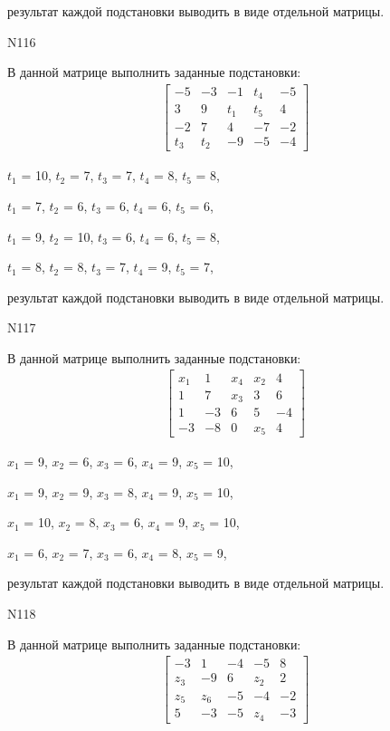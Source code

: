 \documentclass[11pt]{report}
\begin{document}
результат каждой подстановки выводить в виде отдельной матрицы.

N116

В данной матрице выполнить заданные подстановки:
\begin{align*}
\left[\begin{matrix}-5 & -3 & -1 & t_{4} & -5\\3 & 9 & t_{1} & t_{5} & 4\\-2 & 7 & 4 & -7 & -2\\t_{3} & t_{2} & -9 & -5 & -4\end{matrix}\right]
\end{align*}


$t_{1}$ = 10, $t_{2}$ = 7, $t_{3}$ = 7, $t_{4}$ = 8, $t_{5}$ = 8, 

$t_{1}$ = 7, $t_{2}$ = 6, $t_{3}$ = 6, $t_{4}$ = 6, $t_{5}$ = 6, 

$t_{1}$ = 9, $t_{2}$ = 10, $t_{3}$ = 6, $t_{4}$ = 6, $t_{5}$ = 8, 

$t_{1}$ = 8, $t_{2}$ = 8, $t_{3}$ = 7, $t_{4}$ = 9, $t_{5}$ = 7, 

результат каждой подстановки выводить в виде отдельной матрицы.

N117

В данной матрице выполнить заданные подстановки:
\begin{align*}
\left[\begin{matrix}x_{1} & 1 & x_{4} & x_{2} & 4\\1 & 7 & x_{3} & 3 & 6\\1 & -3 & 6 & 5 & -4\\-3 & -8 & 0 & x_{5} & 4\end{matrix}\right]
\end{align*}


$x_{1}$ = 9, $x_{2}$ = 6, $x_{3}$ = 6, $x_{4}$ = 9, $x_{5}$ = 10, 

$x_{1}$ = 9, $x_{2}$ = 9, $x_{3}$ = 8, $x_{4}$ = 9, $x_{5}$ = 10, 

$x_{1}$ = 10, $x_{2}$ = 8, $x_{3}$ = 6, $x_{4}$ = 9, $x_{5}$ = 10, 

$x_{1}$ = 6, $x_{2}$ = 7, $x_{3}$ = 6, $x_{4}$ = 8, $x_{5}$ = 9, 

результат каждой подстановки выводить в виде отдельной матрицы.

N118

В данной матрице выполнить заданные подстановки:
\begin{align*}
\left[\begin{matrix}-3 & 1 & -4 & -5 & 8\\z_{3} & -9 & 6 & z_{2} & 2\\z_{5} & z_{6} & -5 & -4 & -2\\5 & -3 & -5 & z_{4} & -3\end{matrix}\right]
\end{align*}
\end{document}
